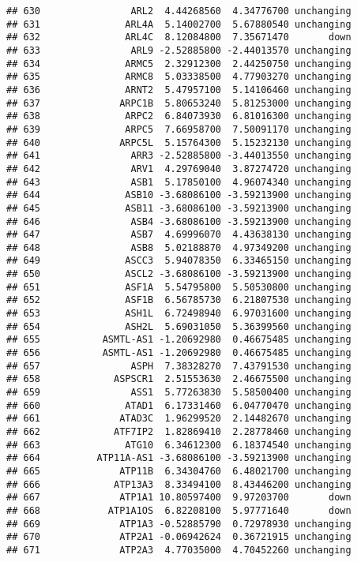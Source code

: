 \documentclass[]{article}
\begin{document}
\begin{verbatim}
## 630                ARL2  4.44268560  4.34776700 unchanging
## 631               ARL4A  5.14002700  5.67880540 unchanging
## 632               ARL4C  8.12084800  7.35671470       down
## 633                ARL9 -2.52885800 -2.44013570 unchanging
## 634               ARMC5  2.32912300  2.44250750 unchanging
## 635               ARMC8  5.03338500  4.77903270 unchanging
## 636               ARNT2  5.47957100  5.14106460 unchanging
## 637              ARPC1B  5.80653240  5.81253000 unchanging
## 638               ARPC2  6.84073930  6.81016300 unchanging
## 639               ARPC5  7.66958700  7.50091170 unchanging
## 640              ARPC5L  5.15764300  5.15232130 unchanging
## 641                ARR3 -2.52885800 -3.44013550 unchanging
## 642                ARV1  4.29769040  3.87274720 unchanging
## 643                ASB1  5.17850100  4.96074340 unchanging
## 644               ASB10 -3.68086100 -3.59213900 unchanging
## 645               ASB11 -3.68086100 -3.59213900 unchanging
## 646                ASB4 -3.68086100 -3.59213900 unchanging
## 647                ASB7  4.69996070  4.43638130 unchanging
## 648                ASB8  5.02188870  4.97349200 unchanging
## 649               ASCC3  5.94078350  6.33465150 unchanging
## 650               ASCL2 -3.68086100 -3.59213900 unchanging
## 651               ASF1A  5.54795800  5.50530800 unchanging
## 652               ASF1B  6.56785730  6.21807530 unchanging
## 653               ASH1L  6.72498940  6.97031600 unchanging
## 654               ASH2L  5.69031050  5.36399560 unchanging
## 655           ASMTL-AS1 -1.20692980  0.46675485 unchanging
## 656           ASMTL-AS1 -1.20692980  0.46675485 unchanging
## 657                ASPH  7.38328270  7.43791530 unchanging
## 658             ASPSCR1  2.51553630  2.46675500 unchanging
## 659                ASS1  5.77263830  5.58500400 unchanging
## 660               ATAD1  6.17331460  6.04770470 unchanging
## 661              ATAD3C  1.96299520  2.14482670 unchanging
## 662             ATF7IP2  1.82869410  2.28778460 unchanging
## 663               ATG10  6.34612300  6.18374540 unchanging
## 664          ATP11A-AS1 -3.68086100 -3.59213900 unchanging
## 665              ATP11B  6.34304760  6.48021700 unchanging
## 666             ATP13A3  8.33494100  8.43446200 unchanging
## 667              ATP1A1 10.80597400  9.97203700       down
## 668            ATP1A1OS  6.82208100  5.97771640       down
## 669              ATP1A3 -0.52885790  0.72978930 unchanging
## 670              ATP2A1 -0.06942624  0.36721915 unchanging
## 671              ATP2A3  4.77035000  4.70452260 unchanging

\end{verbatim}
\end{document}
